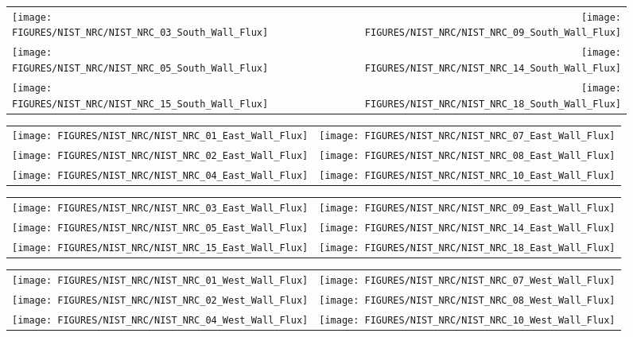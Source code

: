 \begin{figure}[p]
\begin{tabular*}{\textwidth}{l@{\extracolsep{\fill}}r}
\texttt{[image: FIGURES/NIST\_NRC/NIST\_NRC\_03\_South\_Wall\_Flux]} &
\texttt{[image: FIGURES/NIST\_NRC/NIST\_NRC\_09\_South\_Wall\_Flux]} \\
\texttt{[image: FIGURES/NIST\_NRC/NIST\_NRC\_05\_South\_Wall\_Flux]} &
\texttt{[image: FIGURES/NIST\_NRC/NIST\_NRC\_14\_South\_Wall\_Flux]} \\
\texttt{[image: FIGURES/NIST\_NRC/NIST\_NRC\_15\_South\_Wall\_Flux]} &
\texttt{[image: FIGURES/NIST\_NRC/NIST\_NRC\_18\_South\_Wall\_Flux]}
\end{tabular*}
\label{NIST_NRC_South_Wall_Flux_Open}
\end{figure}


\begin{figure}[p]
\begin{tabular*}{\textwidth}{l@{\extracolsep{\fill}}r}
\texttt{[image: FIGURES/NIST\_NRC/NIST\_NRC\_01\_East\_Wall\_Flux]} &
\texttt{[image: FIGURES/NIST\_NRC/NIST\_NRC\_07\_East\_Wall\_Flux]} \\
\texttt{[image: FIGURES/NIST\_NRC/NIST\_NRC\_02\_East\_Wall\_Flux]} &
\texttt{[image: FIGURES/NIST\_NRC/NIST\_NRC\_08\_East\_Wall\_Flux]} \\
\texttt{[image: FIGURES/NIST\_NRC/NIST\_NRC\_04\_East\_Wall\_Flux]} &
\texttt{[image: FIGURES/NIST\_NRC/NIST\_NRC\_10\_East\_Wall\_Flux]}
\end{tabular*}
\label{NIST_NRC_East_Wall_Flux_Closed}
\end{figure}

\begin{figure}[p]
\begin{tabular*}{\textwidth}{l@{\extracolsep{\fill}}r}
\texttt{[image: FIGURES/NIST\_NRC/NIST\_NRC\_03\_East\_Wall\_Flux]} &
\texttt{[image: FIGURES/NIST\_NRC/NIST\_NRC\_09\_East\_Wall\_Flux]} \\
\texttt{[image: FIGURES/NIST\_NRC/NIST\_NRC\_05\_East\_Wall\_Flux]} &
\texttt{[image: FIGURES/NIST\_NRC/NIST\_NRC\_14\_East\_Wall\_Flux]} \\
\texttt{[image: FIGURES/NIST\_NRC/NIST\_NRC\_15\_East\_Wall\_Flux]} &
\texttt{[image: FIGURES/NIST\_NRC/NIST\_NRC\_18\_East\_Wall\_Flux]}
\end{tabular*}
\label{NIST_NRC_East_Wall_Flux_Open}
\end{figure}


\begin{figure}[p]
\begin{tabular*}{\textwidth}{l@{\extracolsep{\fill}}r}
\texttt{[image: FIGURES/NIST\_NRC/NIST\_NRC\_01\_West\_Wall\_Flux]} &
\texttt{[image: FIGURES/NIST\_NRC/NIST\_NRC\_07\_West\_Wall\_Flux]} \\
\texttt{[image: FIGURES/NIST\_NRC/NIST\_NRC\_02\_West\_Wall\_Flux]} &
\texttt{[image: FIGURES/NIST\_NRC/NIST\_NRC\_08\_West\_Wall\_Flux]} \\
\texttt{[image: FIGURES/NIST\_NRC/NIST\_NRC\_04\_West\_Wall\_Flux]} &
\texttt{[image: FIGURES/NIST\_NRC/NIST\_NRC\_10\_West\_Wall\_Flux]}
\end{tabular*}
\label{NIST_NRC_West_Wall_Flux_Closed}
\end{figure}

